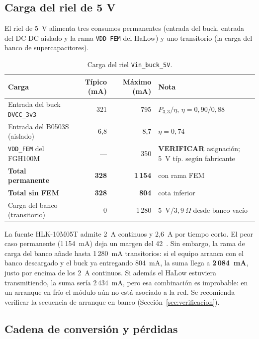 \documentclass[11pt,a4paper]{article}
\newcommand{\pct}{\text{\char37}}
\newcommand{\revisar}{\textcolor{warn}{\textbf{VERIFICAR}}}
\begin{document}
\subsection{Carga del riel de 5 V}

El riel de 5~V alimenta tres consumos permanentes (entrada del buck, entrada del
DC-DC aislado y la rama \texttt{VDD\_FEM} del HaLow) y uno transitorio (la carga
del banco de supercapacitores).

\begin{table}[H]
\centering
\caption{Carga del riel \texttt{Vin\_buck\_5V}.}
\label{tab:riel5}
\small
\begin{tabularx}{\textwidth}{@{}X r r l@{}}
\toprule
\textbf{Carga} & \textbf{Típico (mA)} & \textbf{Máximo (mA)} & \textbf{Nota} \\
\midrule
Entrada del buck \texttt{DVCC\_3v3} & 321 & 795 & $P_{3,3}/\eta$, $\eta=0{,}90/0{,}88$ \\
Entrada del B0503S (aislado) & 6,8 & 8,7 & $\eta=0{,}74$ \\
\texttt{VDD\_FEM} del FGH100M & --- & 350 & \revisar{} asignación; 5~V típ. según fabricante \\
\midrule
\textbf{Total permanente} & \textbf{328} & \textbf{1\,154} & con rama FEM \\
\textbf{Total sin FEM} & \textbf{328} & \textbf{804} & cota inferior \\
\midrule
Carga del banco (transitorio) & 0 & 1\,280 & $5$~V$/3{,}9~\Omega$ desde banco vacío \\
\bottomrule
\end{tabularx}
\end{table}

\noindent La fuente HLK-10M05T admite 2~A continuos y 2,6~A por tiempo corto.
El peor caso permanente (1\,154~mA) deja un margen del 42~\pct{}. Sin embargo,
la rama de carga del banco añade hasta 1\,280~mA transitorios: si el equipo
arranca con el banco descargado y el buck ya entregando 804~mA, la suma llega a
\textbf{2\,084~mA}, justo por encima de los 2~A continuos. Si además el HaLow
estuviera transmitiendo, la suma sería 2\,434~mA, pero esa combinación es
improbable: en un arranque en frío el módulo aún no está asociado a la red. Se
recomienda verificar la secuencia de arranque en banco
(Sección~\ref{sec:verificacion}).

\subsection{Cadena de conversión y pérdidas}
\end{document}
